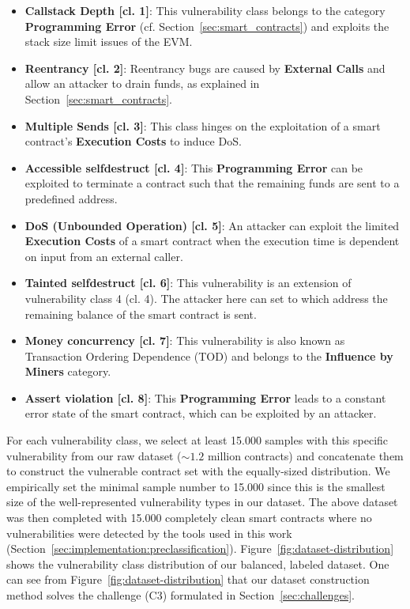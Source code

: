 \begin{itemize}
\item \textbf{Callstack Depth [cl. 1]}: 
This vulnerability class belongs to the category \textbf{Programming Error} (cf. Section~\ref{sec:smart_contracts}) and exploits the stack size limit issues of the EVM.

\item \textbf{Reentrancy [cl. 2]}: %
Reentrancy bugs are caused by \textbf{External Calls} and allow an attacker to drain funds, as explained in Section~\ref{sec:smart_contracts}.

\item \textbf{Multiple Sends [cl. 3]}:
This class hinges on the exploitation of a smart contract's \textbf{Execution Costs} to induce DoS.

\item \textbf{Accessible selfdestruct [cl. 4]}: 
This \textbf{Programming Error} can be exploited to terminate a contract such that the remaining funds are sent to a predefined address.

\item \textbf{DoS (Unbounded Operation) [cl. 5]}: 
An attacker can exploit the limited \textbf{Execution Costs} of a smart contract when the execution time is dependent on input from an external caller.

\item \textbf{Tainted selfdestruct [cl. 6]}: 
This vulnerability is an extension of vulnerability class 4 (cl. 4). The attacker here can set to which address the remaining balance of the smart contract is sent.

\item \textbf{Money concurrency [cl. 7]}:
This vulnerability is also known as Transaction Ordering Dependence (TOD) and belongs to the \textbf{Influence by Miners} category.

\item \textbf{Assert violation [cl. 8]}:
This \textbf{Programming Error} leads to a constant error state of the smart contract, which can be exploited by an attacker.
\end{itemize}

For each vulnerability class, we select at least 15.000 samples with this specific vulnerability from our raw dataset ($\sim 1.2$ million contracts) and concatenate them to construct the vulnerable contract set with the equally-sized distribution. 
We empirically set the minimal sample number to 15.000 since this is the smallest size of the well-represented vulnerability types in our dataset. The above dataset was then completed with 15.000 completely clean smart contracts where no vulnerabilities were detected by the tools used in this work (Section~\ref{sec:implementation:preclassification}).
Figure~\ref{fig:dataset-distribution} shows the vulnerability class distribution of our balanced, labeled dataset.  
One can see from Figure~\ref{fig:dataset-distribution} that our dataset construction method solves the challenge (C3) formulated in Section~\ref{sec:challenges}.

